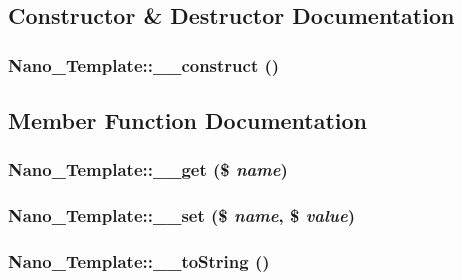 \subsection{Constructor \& Destructor Documentation}
\hypertarget{classNano__Template_7e846712272099c6acd6783a48cdad39}{
\subsubsection[{\_\-\_\-construct}]{\setlength{\rightskip}{0pt plus 5cm}Nano\_\-Template::\_\-\_\-construct ()}}
\label{classNano__Template_7e846712272099c6acd6783a48cdad39}




\subsection{Member Function Documentation}
\hypertarget{classNano__Template_e27a9fd6e4e2c0d289fccdc3f40a7b99}{
\subsubsection[{\_\-\_\-get}]{\setlength{\rightskip}{0pt plus 5cm}Nano\_\-Template::\_\-\_\-get (\$ {\em name})}}
\label{classNano__Template_e27a9fd6e4e2c0d289fccdc3f40a7b99}


\hypertarget{classNano__Template_a9201426bd79ac9b6f25b7f9fc943ca9}{
\subsubsection[{\_\-\_\-set}]{\setlength{\rightskip}{0pt plus 5cm}Nano\_\-Template::\_\-\_\-set (\$ {\em name}, \/  \$ {\em value})}}
\label{classNano__Template_a9201426bd79ac9b6f25b7f9fc943ca9}


\hypertarget{classNano__Template_511c55a01e2e3775ed2da95da94b6dfd}{
\subsubsection[{\_\-\_\-toString}]{\setlength{\rightskip}{0pt plus 5cm}Nano\_\-Template::\_\-\_\-toString ()}}
\label{classNano__Template_511c55a01e2e3775ed2da95da94b6dfd}



